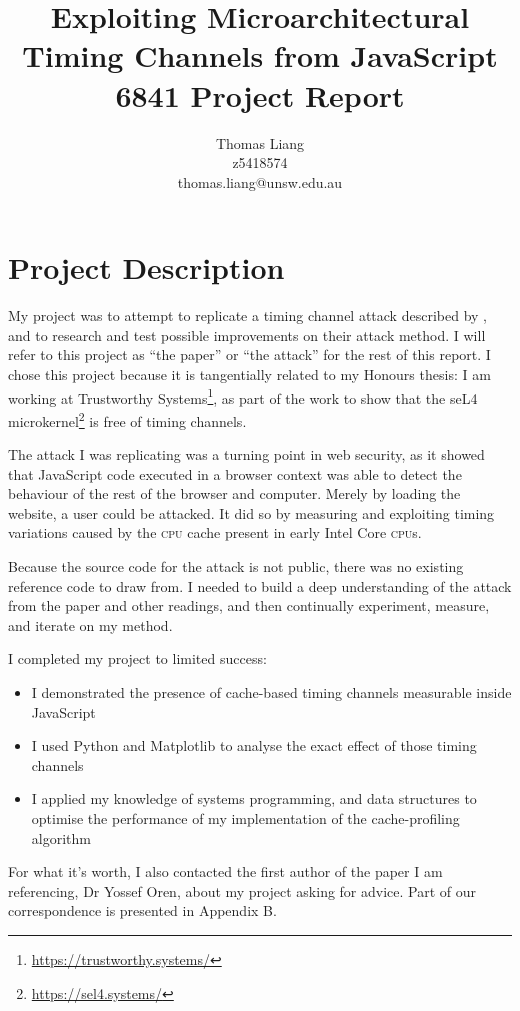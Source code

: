 \documentclass[a4paper,10pt,twocolumn]{article}
\title{
  Exploiting Microarchitectural Timing Channels from JavaScript \\
  \acronym{Comp}6841 Project Report}
\author{Thomas Liang \\ z5418574 \\ \textsf{thomas.liang@unsw.edu.au}} %
\theoremstyle{definition}
\newcommand*{\acronym}{\textsc}
\begin{document}
\maketitle

\section{Project Description}

My project was to attempt to replicate a timing channel attack described by
\textcite{Oren_KSK_2015}, and to research and test possible improvements on
their attack method.
I will refer to this project as ``the paper'' or ``the attack'' for the rest of
this report.
I chose this project because it is tangentially related to my Honours thesis: I
am working at Trustworthy Systems\footnote{\url{https://trustworthy.systems/}},
as part of the work to show that the seL4
microkernel\footnote{\url{https://sel4.systems/}} is free of timing channels.

The attack I was replicating was a turning point in web security, as it showed
that JavaScript code executed in a browser context was able to detect the
behaviour of the rest of the browser and computer.
Merely by loading the website, a user could be attacked.
It did so by measuring and exploiting timing variations caused by the
\acronym{cpu} cache present in early Intel Core \acronym{cpu}s.

Because the source code for the attack is not public, there was no existing
reference code to draw from.
I needed to build a deep understanding of the attack from the paper and other
readings, and then continually experiment, measure, and iterate on my method.

I completed my project to limited success:
\begin{itemize}[nosep]
\item I demonstrated the presence of cache-based timing channels measurable
  inside JavaScript
\item I used Python and Matplotlib to analyse the exact effect of those timing
  channels
\item I applied my knowledge of systems programming, and data structures to
  optimise the performance of my implementation of the cache-profiling algorithm
\end{itemize}
For what it's worth, I also contacted the first author of the paper I am
referencing, Dr Yossef Oren, about my project asking for advice.
Part of our correspondence is presented in Appendix B.
\end{document}
